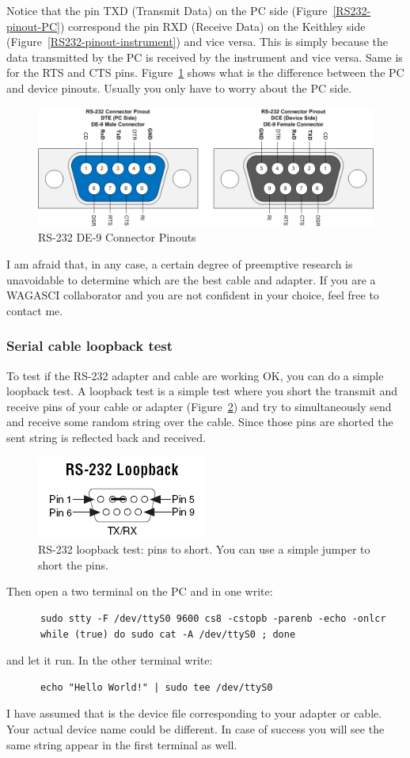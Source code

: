 Notice that the pin TXD (Transmit Data) on the PC side
(Figure~\ref{RS232-pinout-PC}) correspond the pin RXD (Receive Data) on the
Keithley side (Figure~\ref{RS232-pinout-instrument}) and vice versa. This is
simply because the data transmitted by the PC is received by the instrument and
vice versa. Same is for the RTS and CTS pins.
Figure~\ref{RS-232_DE-9_Connector_Pinouts} shows what is the difference between
the PC and device pinouts. Usually you only have to worry about the PC side.
\begin{figure}[ht]
  \centering \includegraphics[width=0.9\linewidth]{RS-232_DE-9_Connector_Pinouts}
  \caption{RS-232 DE-9 Connector Pinouts}\label{RS-232_DE-9_Connector_Pinouts}
\end{figure}
I am afraid that, in any case, a certain degree of preemptive research is
unavoidable to determine which are the best cable and adapter. If you are a
WAGASCI collaborator and you are not confident in your choice, feel free to
contact me.
\subsubsection{Serial cable loopback test}
To test if the RS-232 adapter and cable are working OK, you can do a simple
loopback test. A loopback test is a simple test where you short the transmit and
receive pins of your cable or adapter (Figure~\ref{RS-232_loopback}) and try to
simultaneously send and receive some random string over the cable. Since those
pins are shorted the sent string is reflected back and received.
\begin{figure}[ht]
  \centering \includegraphics[width=0.4\linewidth]{RS-232_loopback}
  \caption{RS-232 loopback test: pins to short. You can use a simple
    jumper to short the pins.}\label{RS-232_loopback}
\end{figure}
Then open a two terminal on the PC and in one write:
\begin{lstlisting}
      sudo stty -F /dev/ttyS0 9600 cs8 -cstopb -parenb -echo -onlcr
      while (true) do sudo cat -A /dev/ttyS0 ; done
\end{lstlisting}
  and let it run. In the other terminal write:
\begin{lstlisting}
      echo "Hello World!" | sudo tee /dev/ttyS0
\end{lstlisting}
I have assumed that  is the device file corresponding to
your adapter or cable. Your actual device name could be different. In case of
success you will see the same string appear in the first terminal as well.
